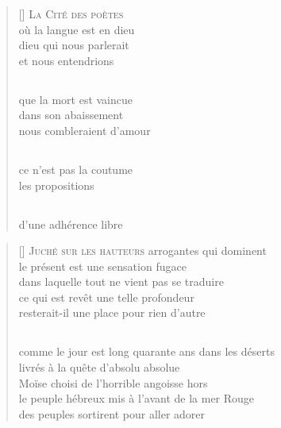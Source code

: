\documentclass[a4paper, titlepage, twoside, 12pt]{book}
\begin{document}
\vspace*{2cm}
\settowidth{\versewidth}{ou la langue est en dieu}
\poemtitle*{}
\begin{verse}[\versewidth]
{\lettrine[lines=1]{\textcolor[gray]{0.6}{L}}{\space a Cité des poètes}}\\
où la langue est en dieu\\
dieu qui nous parlerait\\
et nous entendrions
\subsection*{}
que la mort est vaincue\\
dans son abaissement\\
nous combleraient d'amour
\subsection*{}
ce n'est pas la coutume\\
les propositions
\subsection*{}
d'une adhérence libre

\end{verse}

\newpage

\vspace*{2cm}
\settowidth{\versewidth}{comme le jour est long quarante ans dans les déserts}
\begin{verse}[\versewidth]
{\lettrine[lines=1]{\textcolor[gray]{0.6}{J}}{\space uché sur les hauteurs}} arrogantes qui dominent\\
le présent est une sensation fugace\\
dans laquelle tout ne vient pas se traduire\\
ce qui est revêt une telle profondeur\\
resterait-il une place pour rien d'autre
\subsection*{}
comme le jour est long quarante ans dans les déserts\\
livrés à la quête d'absolu absolue\\
Moïse choisi de l'horrible angoisse hors\\
le peuple hébreux mis à l'avant de la mer Rouge\\
des peuples sortirent pour aller adorer
\end{verse}
\end{document}

